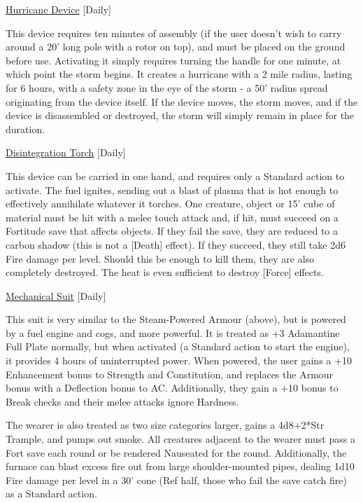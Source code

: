 \noindent\underline{Hurricane Device} [Daily]
 
\noindent This device requires ten minutes of assembly (if the user doesn't wish to carry around a 20' long pole with a rotor on top), and must be placed on the ground before use. Activating it simply requires turning the handle for one minute, at which point the storm begins. It creates a hurricane with a 2 mile radius, lasting for 6 hours, with a safety zone in the eye of the storm - a 50' radius spread originating from the device itself. If the device moves, the storm moves, and if the device is disassembled or destroyed, the storm will simply remain in place for the duration. 

\medskip\noindent\underline{Disintegration Torch} [Daily] 

\noindent This device can be carried in one hand, and requires only a Standard action to activate. The fuel ignites, sending out a blast of plasma that is hot enough to effectively annihilate whatever it torches. One creature, object or 15' cube of material must be hit with a melee touch attack and, if hit, must succeed on a Fortitude save that affects objects. If they fail the save, they are reduced to a carbon shadow (this is not a [Death] effect). If they succeed, they still take 2d6 Fire damage per level. Should this be enough to kill them, they are also completely destroyed. The heat is even sufficient to destroy [Force] effects. 

\medskip\noindent\underline{Mechanical Suit} [Daily] 

\noindent This suit is very similar to the Steam-Powered Armour (above), but is powered by a fuel engine and cogs, and more powerful. It is treated as +3 Adamantine Full Plate normally, but when activated (a Standard action to start the engine), it provides 4 hours of uninterrupted power. When powered, the user gains a +10 Enhancement bonus to Strength and Constitution, and replaces the Armour bonus with a Deflection bonus to AC. Additionally, they gain a +10 bonus to Break checks and their melee attacks ignore Hardness. 

\smallskip\noindent The wearer is also treated as two size categories larger, gains a 4d8+2*Str Trample, and pumps out smoke. All creatures adjacent to the wearer must pass a Fort save each round or be rendered Nauseated for the round. Additionally, the furnace can blast excess fire out from large shoulder-mounted pipes, dealing 1d10 Fire damage per level in a 30' cone (Ref half, those who fail the save catch fire) as a Standard action. 


